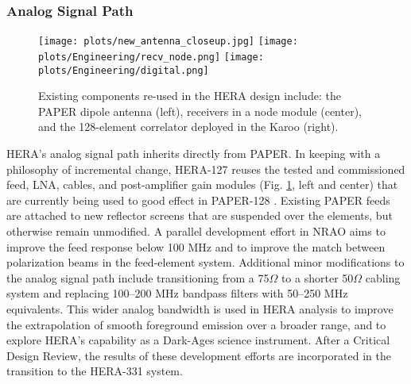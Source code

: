 \documentclass[preprint]{aastex}
\newcommand{\Mycitep}[1]{{\bf \citep{#1}}}
\newcommand{\compress}{\vspace{-0.25in}}
\newcommand{\Caption}[4]{\vspace{#1}\renewcommand{\baselinestretch}{#2}\caption{#4}\vspace{#3}}
\begin{document}
\compress
\subsubsection{Analog Signal Path}

\begin{figure}[t]
    \centering
        \texttt{[image: plots/new\_antenna\_closeup.jpg]}
        \texttt{[image: plots/Engineering/recv\_node.png]}
        \texttt{[image: plots/Engineering/digital.png]}
    \Caption{-0.1in}{0.99}{-0.1in}{\small
    Existing components re-used in the HERA design include:
    the PAPER dipole antenna (left), 
    receivers in a node module (center), and
    the 128-element correlator deployed in the Karoo (right).
}\label{fig:components}
\end{figure}

HERA's analog signal path inherits directly from PAPER.
In keeping with a philosophy of
incremental change,
HERA-127 reuses the tested and commissioned feed, LNA, cables, and post-amplifier gain modules
(Fig. \ref{fig:components}, left and center) that are currently being
used to good effect in PAPER-128 \Mycitep{parsons_et_al2010}.  Existing PAPER feeds are attached to new
reflector screens that are suspended over the elements, but otherwise remain unmodified.
A parallel development effort in NRAO aims to improve the feed response below
100 MHz 
and to improve the match between polarization beams in the feed-element system.  
Additional
minor modifications to the analog signal path include transitioning from a 75$\Omega$ to a
shorter 50$\Omega$ cabling system and replacing 100--200 MHz bandpass filters with 50--250 MHz equivalents.
This wider analog bandwidth is used in HERA analysis to improve the extrapolation of smooth foreground
emission over a broader range, and to explore HERA's capability as a Dark-Ages science instrument.
After a Critical Design Review, the results of these development efforts are incorporated in
the transition to the HERA-331 system.  

%


\end{document}
